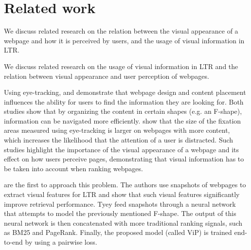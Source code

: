 
\section{Related work}
\label{sec:relatedwork}

We discuss related research on the relation between the visual appearance of a webpage and how it is perceived by users, and the usage of visual information in \ac{LTR}.

We discuss related research on the usage of visual information in \ac{LTR} and the relation between visual appearance and user perception of webpages.


Using eye-tracking, \citet{nielsen2006f} and \citet{pernice2017f} demonstrate that webpage design and content placement influences the ability for users to find the information they are looking for. 
Both studies show that by organizing the content in certain shapes (e.g. an F-shape), information can be  navigated more efficiently.
\citet{wang2014eye} show that the size of the fixation areas measured using eye-tracking is larger on webpages with more content, which increases the likelihood that the attention of a user is distracted.
Such studies highlight the importance of the visual appearance of a webpage and its effect on how users perceive pages, demonstrating that visual information has to be taken into account when ranking webpages.

\citet{fan2017learning} are the first to approach this problem.
The authors use snapshots of webpages to extract visual features for LTR
and show that such visual features significantly improve retrieval performance.
Tyey feed snapshots through a neural network that attempts to model the previously mentioned F-shape.
The output of this neural network is then concatenated with more traditional ranking signals, such as BM25 and PageRank.
Finally, the proposed model (called ViP) is trained end-to-end by using a pairwise loss.

